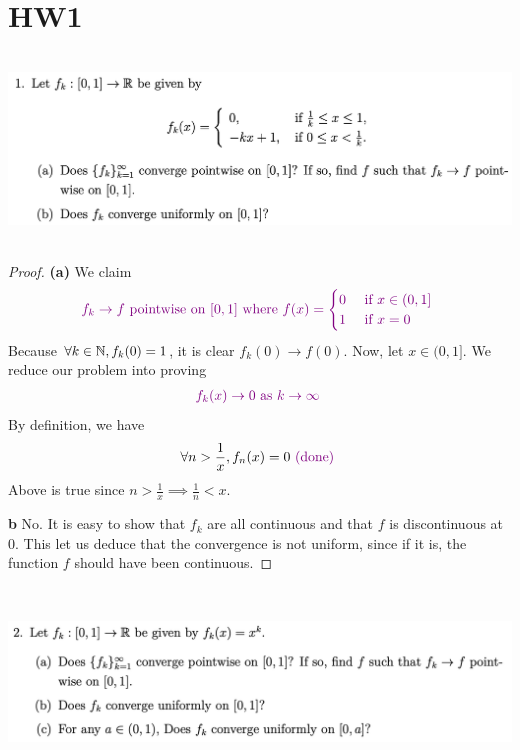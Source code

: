 \documentclass{report}
\begin{document}
\section{HW1}
\begin{question}{}{}
\includegraphics[height=5cm,width=18cm]{HW1.7}
\end{question}
\begin{proof}
\textbf{(a)} 
We claim 
\begin{align*}
\textcolor{violet}{f_k \to f\text{ pointwise  on $[0,1]$ where }f(x)=\begin{cases}
    0& \text{ if $x\in (0,1]$ } \\
    1& \text{ if $x=0$ }
\end{cases}}
\end{align*}
Because $\forall k\in\mathbb{N}, f_k(0)=1$, it is clear $f_k(0)\to f(0)$. Now, let $x \in (0,1]$. We reduce our problem into proving 
\begin{align*}
\textcolor{violet}{f_k(x)\to 0\text{ as $k \to \infty$ }}
\end{align*}
By definition, we have 
\begin{align*}
\forall n>\frac{1}{x}, f_n(x)=0\textcolor{violet}{\text{ (done) }}
\end{align*}
Above is true since $n>\frac{1}{x}\implies \frac{1}{n}<x$. 

\textbf{b}
No. It is easy to show that $f_k$ are all continuous and that $f$ is discontinuous at $0$. This let us deduce that the convergence is not uniform, since if it is, the function $f$ should have been continuous. 
\end{proof}
\begin{question}{}{}
\includegraphics[height=5cm,width=18cm]{HW1.6}
\end{question}
\end{document}
